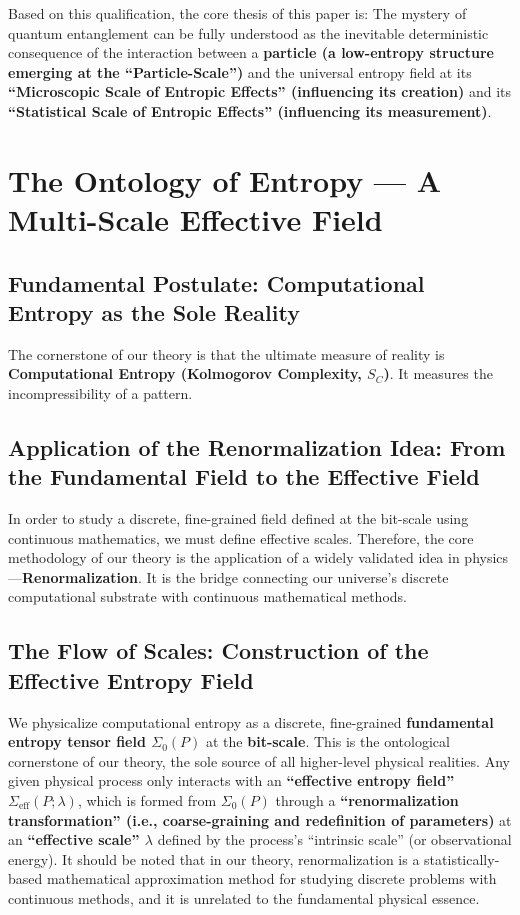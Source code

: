 \documentclass[11pt]{article}
\begin{document}
\noindent Based on this qualification, the core thesis of this paper is: The mystery of quantum entanglement can be fully understood as the inevitable deterministic consequence of the interaction between a \textbf{particle (a low-entropy structure emerging at the ``Particle-Scale'')} and the universal entropy field at its \textbf{``Microscopic Scale of Entropic Effects'' (influencing its creation)} and its \textbf{``Statistical Scale of Entropic Effects'' (influencing its measurement)}.


\section{The Ontology of Entropy — A Multi-Scale Effective Field}

\subsection{Fundamental Postulate: Computational Entropy as the Sole Reality}
The cornerstone of our theory is that the ultimate measure of reality is \textbf{Computational Entropy (Kolmogorov Complexity, $S_C$)}. It measures the incompressibility of a pattern.

\subsection{Application of the Renormalization Idea: From the Fundamental Field to the Effective Field}
In order to study a discrete, fine-grained field defined at the bit-scale using continuous mathematics, we must define effective scales. Therefore, the core methodology of our theory is the application of a widely validated idea in physics—\textbf{Renormalization}. It is the bridge connecting our universe's discrete computational substrate with continuous mathematical methods.

\subsection{The Flow of Scales: Construction of the Effective Entropy Field}
We physicalize computational entropy as a discrete, fine-grained \textbf{fundamental entropy tensor field $\Sigma_0(P)$} at the \textbf{bit-scale}. This is the ontological cornerstone of our theory, the sole source of all higher-level physical realities. Any given physical process only interacts with an \textbf{``effective entropy field'' $\Sigma_{\text{eff}}(P; \lambda)$}, which is formed from $\Sigma_0(P)$ through a \textbf{``renormalization transformation'' (i.e., coarse-graining and redefinition of parameters)} at an \textbf{``effective scale'' $\lambda$} defined by the process's ``intrinsic scale'' (or observational energy). It should be noted that in our theory, renormalization is a statistically-based mathematical approximation method for studying discrete problems with continuous methods, and it is unrelated to the fundamental physical essence.
\end{document}
